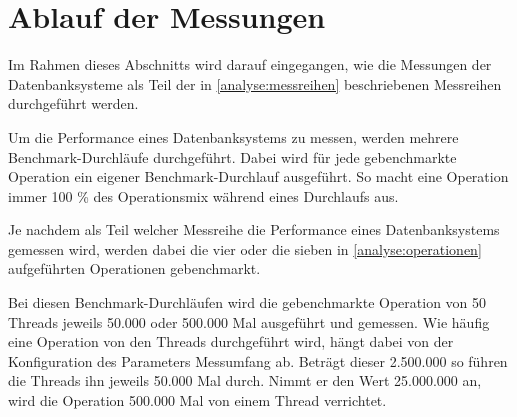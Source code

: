 \section{Ablauf der Messungen}
Im Rahmen dieses Abschnitts wird darauf eingegangen, wie die Messungen der Datenbanksysteme als Teil der in \autoref{analyse:messreihen} beschriebenen Messreihen durchgeführt werden. 

Um die Performance eines Datenbanksystems zu messen, werden mehrere Benchmark-Durchläufe durchgeführt. Dabei wird für jede gebenchmarkte Operation ein eigener Benchmark-Durchlauf ausgeführt. So macht eine Operation immer 100 \% des Operationsmix während eines Durchlaufs aus. 

Je nachdem als Teil welcher Messreihe die Performance eines Datenbanksystems gemessen wird, werden dabei die vier oder die sieben in \autoref{analyse:operationen} aufgeführten Operationen gebenchmarkt. 

Bei diesen Benchmark-Durchläufen wird die gebenchmarkte Operation von 50 Threads jeweils 50.000 oder 500.000 Mal ausgeführt und gemessen. Wie häufig eine Operation von den Threads durchgeführt wird, hängt dabei von der Konfiguration des Parameters Messumfang ab. Beträgt dieser 2.500.000 so führen die Threads ihn jeweils 50.000 Mal durch. Nimmt er den Wert 25.000.000 an, wird die Operation 500.000 Mal von einem Thread verrichtet. 